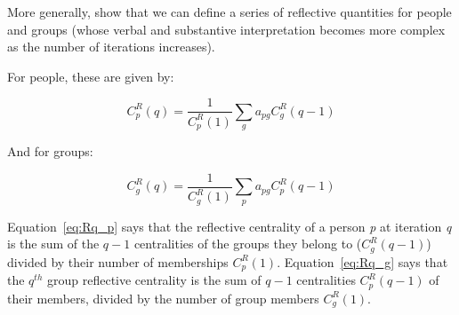 \documentclass[a4paper,fleqn]{cas-sc}
\begin{document}
More generally, \citet{hidalgo2009building} show that we can define a series of reflective quantities for people and groups (whose verbal and substantive interpretation becomes more complex as the number of iterations increases). 

For people, these are given by:

\begin{equation}   
    C^R_p(q) = \frac{1}{C^R_p(1)}\sum_g a_{pg}C^R_g(q-1) 
   \label{eq:Rq_p}
\end{equation}

And for groups:

\begin{equation}
   C^R_g(q) = \frac{1}{C^R_g(1)}\sum_p a_{pg}C^R_p(q-1)
   \label{eq:Rq_g}
\end{equation}

Equation~\ref{eq:Rq_p} says that the reflective centrality of a person \textit{p} at iteration \textit{q} is the sum of the $q-1$ centralities of the groups they belong to ($C^R_g(q-1)$) divided by their number of memberships $C^{R}_p(1)$. Equation~\ref{eq:Rq_g} says that the $q^{th}$ group reflective centrality is the sum of $q-1$ centralities $C^R_p(q-1)$ of their members, divided by the number of group members $C^R_g(1)$.
\end{document}
